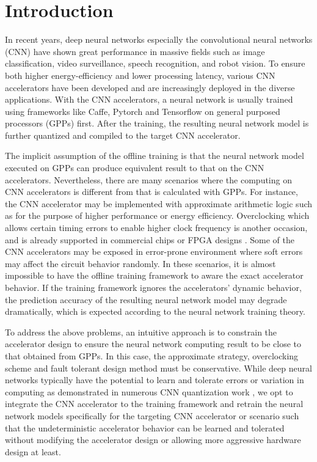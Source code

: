 \section{Introduction} \label{sec:intro}
In recent years, deep neural networks especially the convolutional neural networks (CNN) 
have shown great performance in massive fields such as image classification, 
video surveillance, speech recognition, and robot vision. To ensure both 
higher energy-efficiency and lower processing latency, various CNN accelerators 
\cite{pipecnn_2,Zhang2015_9,Qiu2016_10,deepburing_12,Farabet2010_13,Zeng2018_18} 
have been developed and are increasingly deployed in the diverse applications. 
With the CNN accelerators, a neural network is usually trained 
using frameworks like Caffe, Pytorch and Tensorflow on general purposed 
processors (GPPs) first. After the training, the resulting neural network 
model is further quantized and compiled to the target CNN accelerator. 

The implicit assumption of the offline training is that the neural 
network model executed on GPPs can produce equivalent result to 
that on the CNN accelerators. Nevertheless, there are 
many scenarios where the computing on CNN accelerators 
is different from that is calculated with GPPs. For instance, the 
CNN accelerator may be implemented with approximate arithmetic logic 
such as \cite{Approximate_Multiplier_31,Approximate_32,approximate_33} for 
the purpose of higher performance or energy efficiency. 
Overclocking  \cite{overclock_3,Paceline_15,overclock_35} which allows certain 
timing errors to enable higher clock frequency
is another occasion, and is already supported in commercial chips 
or FPGA designs \cite{overclock_retain_34,overclock_Algorithm_36}. Some of the CNN accelerators may be 
exposed in error-prone environment where soft errors 
may affect the circuit behavior randomly. 
In these scenarios, it is almost impossible to have the offline training 
framework to aware the exact accelerator behavior. 
If the training framework ignores the accelerators’ dynamic 
behavior, the prediction accuracy of the resulting neural 
network model may degrade dramatically, which is expected according to 
the neural network training theory.

To address the above problems, an intuitive approach is to 
constrain the accelerator design to ensure the neural 
network computing result to be close to that obtained from GPPs. 
In this case, the approximate strategy, overclocking scheme and 
fault tolerant design method must be conservative. 
While deep neural networks typically have the potential to 
learn and tolerate errors or variation in computing as demonstrated in 
numerous CNN quantization work \cite{Hwang2014_17,Matthieu2014_8}, we opt to 
integrate the CNN accelerator to the training framework 
and retrain the neural network models specifically for the 
targeting CNN accelerator or scenario such that the undeterministic 
accelerator behavior can be learned and tolerated without 
modifying the accelerator design or allowing more aggressive 
hardware design at least. 


